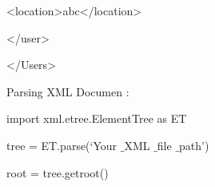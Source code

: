 \documentclass{wileySix}
\begin{document}
\begin{myEnumerate}
{\noindent 
{\fontsize{10pt}{10pt}\selectfont  \hspace*{0.5in}  \hspace*{0.5in} <location>abc</location>} \par
\noindent 
{\fontsize{10pt}{10pt}\selectfont  \hspace*{0.5in} </user>} \par
\noindent 
{\fontsize{10pt}{10pt}\selectfont </Users>} \par
\vspace{10pt}
\noindent 
Parsing XML Documen : \par
\vspace{12pt}
\noindent 
{\fontsize{10pt}{10pt}\selectfont import xml.etree.ElementTree as ET} \par
\noindent 
{\fontsize{10pt}{10pt}\selectfont tree = ET.parse(‘Your $  \_  $XML $  \_  $file $  \_  $path’)} \par
\noindent 
{\fontsize{10pt}{10pt}\selectfont root = tree.getroot()} \par
\noindent 
{\fontsize{10pt}{10pt}\selectfont 	
}\vspace{10pt}

}
\end{myEnumerate}
\end{document}
